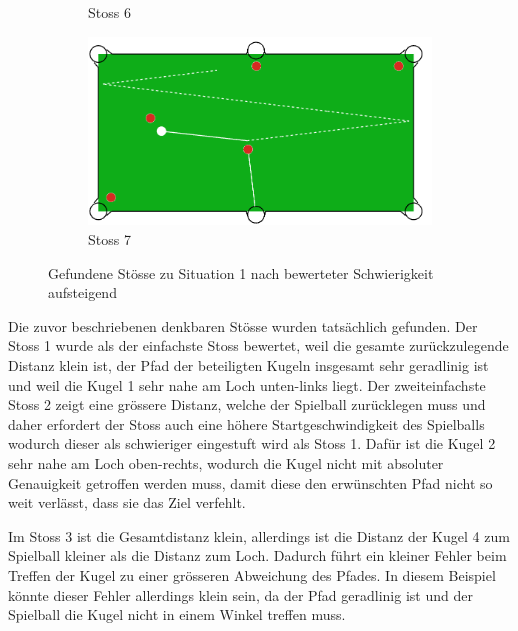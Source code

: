 \begin{figure}[h!]
\begin{subfigure}[b]{0.3\textwidth}
        \caption{Stoss 6}
        \label{fig:situation_1_solution_6}
    \end{subfigure}
    \hfill
    \begin{subfigure}[b]{0.3\textwidth}
        \centering
        \includegraphics[width=1.0\linewidth]{../common/04_results/resources/simple_search/situation_diverse_solution_7.PNG}
        \caption{Stoss 7}
        \label{fig:situation_1_solution_7}
    \end{subfigure}
    \caption{Gefundene Stösse zu Situation 1 nach bewerteter Schwierigkeit aufsteigend}
    \label{fig:situation_1_solutions}
\end{figure}

Die zuvor beschriebenen denkbaren Stösse wurden tatsächlich gefunden.
Der Stoss 1 wurde als der einfachste Stoss bewertet, weil die gesamte zurückzulegende Distanz klein ist,
der Pfad der beteiligten Kugeln insgesamt sehr geradlinig ist und weil die Kugel 1 sehr nahe am Loch unten-links liegt.
Der zweiteinfachste Stoss 2 zeigt eine grössere Distanz, welche der Spielball zurücklegen muss und daher erfordert
der Stoss auch eine höhere Startgeschwindigkeit des Spielballs wodurch dieser als schwieriger eingestuft wird als Stoss 1.
Dafür ist die Kugel 2 sehr nahe am Loch oben-rechts, wodurch die Kugel nicht mit absoluter Genauigkeit getroffen werden
muss, damit diese den erwünschten Pfad nicht so weit verlässt, dass sie das Ziel verfehlt.

Im Stoss 3 ist die Gesamtdistanz klein, allerdings ist die Distanz der Kugel 4 zum Spielball kleiner als die Distanz zum Loch.
Dadurch führt ein kleiner Fehler beim Treffen der Kugel zu einer grösseren Abweichung des Pfades.
In diesem Beispiel könnte dieser Fehler allerdings klein sein, da der Pfad geradlinig ist und der Spielball die Kugel
nicht in einem Winkel treffen muss.

